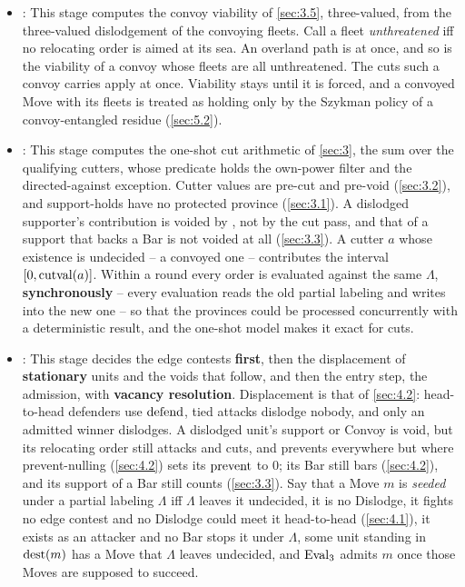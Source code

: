 \documentclass[12pt,a4paper]{article}
\begin{document}
\begin{itemize}
\item {}: This stage computes the convoy viability of \cref{sec:3.5}, three-valued, from the three-valued dislodgement of the convoying fleets.
Call a fleet \emph{unthreatened} iff no relocating order is aimed at its sea.
An overland path is  at once, and so is the viability of a convoy whose fleets are all unthreatened.
The cuts such a convoy carries apply at once.
Viability stays  until it is forced, and a convoyed Move with its fleets is treated as holding only by the Szykman policy of a convoy-entangled residue (\cref{sec:5.2}).
\item {}: This stage computes the one-shot cut arithmetic of \cref{sec:3}, the sum over the qualifying cutters, whose predicate holds the own-power filter and the directed-against exception.
Cutter values are pre-cut and pre-void (\cref{sec:3.2}), and support-holds have no protected province (\cref{sec:3.1}).
A dislodged supporter's contribution is voided by , not by the cut pass, and that of a support that backs a Bar is not voided at all (\cref{sec:3.3}).
A cutter $a$ whose existence is undecided -- a convoyed one -- contributes the interval $[0, \operatorname{cutval}(a)]$.
Within a round every order is evaluated against the same $\Lambda$, \textbf{synchronously} -- every evaluation reads the old partial labeling and writes into the new one -- so that the provinces could be processed concurrently with a deterministic result, and the one-shot model makes it exact for cuts.
\item {}: This stage decides the edge contests \textbf{first}, then the displacement of \textbf{stationary} units and the voids that follow, and then the entry step, the admission, with \textbf{vacancy resolution}.
Displacement is that of \cref{sec:4.2}: head-to-head defenders use $\operatorname{defend}$, tied attacks dislodge nobody, and only an admitted winner dislodges.
A dislodged unit's support or Convoy is void, but its relocating order still attacks and cuts, and prevents everywhere but where prevent-nulling (\cref{sec:4.2}) sets its $\operatorname{prevent}$ to 0; its Bar still bars (\cref{sec:4.2}), and its support of a Bar still counts (\cref{sec:3.3}).
Say that a Move $m$ is \emph{seeded} under a partial labeling $\Lambda$ iff $\Lambda$ leaves it undecided, it is no Dislodge, it fights no edge contest and no Dislodge could meet it head-to-head (\cref{sec:4.1}), it exists as an attacker and no Bar stops it under $\Lambda$, some unit standing in $\operatorname{dest}(m)$ has a Move that $\Lambda$ leaves undecided, and $\operatorname{Eval}_3$ admits $m$ once those Moves are supposed to succeed.

\end{itemize}
\end{document}
